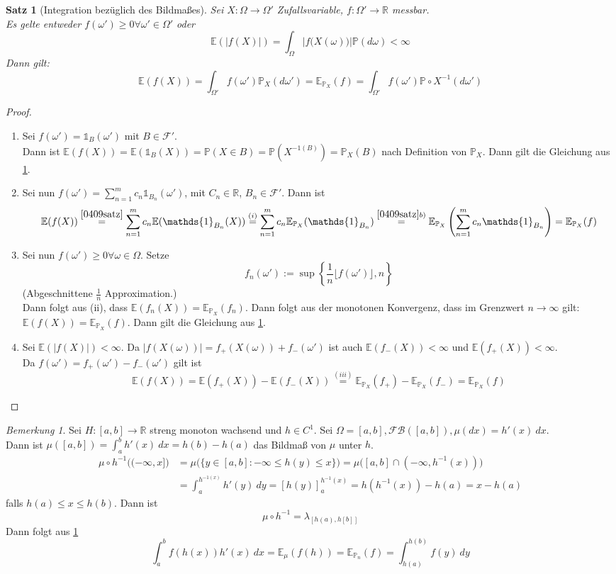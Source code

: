 \documentclass[10pt,a4paper]{article}
\newcommand{\R}{\ensuremath{\mathbb{R}}}
\newcommand{\la}{\ensuremath{\lambda}}
\newcommand{\cha}{\mathds{1}}
\newcommand{\Bor}{\mathscr B}
\newcommand{\Prb}{\mathbb P}
\newcommand{\Epv}{\ensuremath{\mathbb{E}}}
\newcommand{\scF}{\ensuremath{\mathscr{F}}}
\theoremstyle{plain}
\newtheorem{satz}[theorem]{Satz}
\theoremstyle{definition}
\theoremstyle{remark}
\newtheorem{bem}[theorem]{Bemerkung}
\begin{document}
	\begin{satz}[Integration bezüglich des Bildmaßes]\label{0417satz}
		Sei $X:\Omega\to\Omega'$ Zufallsvariable, $f:\Omega'\to\R$ messbar.\\
		Es gelte entweder $f(\omega')\geq 0\forall\omega'\in\Omega'$ oder
		\[\Epv\left(|f(X)|\right)=\int_\Omega|f\big(X(\omega)\big)|\Prb(d\omega)<\infty\]
		Dann gilt:
		\[\Epv(f(X))=\int_{\Omega'}f(\omega')\Prb_X(d\omega')=\Epv_{\Prb_X}(f)=\int_{\Omega'}f(\omega')\Prb\circ X^{-1}(d\omega')\]
	\end{satz}
	\begin{proof}
		\begin{enumerate}[label=(\roman*)]
			\item Sei $f(\omega')=\cha_B(\omega')$ mit $B\in\scF'$.\\
			Dann ist $\Epv(f(X))=\Epv(\cha_B(X))=\Prb(X\in B)=\Prb(X^{-1(B)})=\Prb_X(B)$ nach Definition von $\Prb_X$. Dann gilt die Gleichung aus \ref{0417satz}.
			\item Sei nun $f(\omega')=\sum_{n=1}^{m}c_n\cha_{B_n}(\omega')$, mit $C_n\in\R$, $B_n\in\scF'$.
			Dann ist
			\[\Epv(f(X))\overset{\ref{0409satz}}{=}\sum_{n=1}^{m}c_n\Epv(\cha_{B_n}(X))\overset{(i)}{=}\sum_{n=1}^{m}c_n\Epv_{\Prb_X}(\cha_{B_n})\overset{\ref{0409satz}b)}{=}\Epv_{\Prb_X}\left(\sum_{n=1}^{m}c_n\cha_{B_n}\right)=\Epv_{\Prb_X}(f)\]
			\item Sei nun $f(\omega')\geq 0\forall\omega\in\Omega$. Setze 
			\[f_n(\omega'):=\sup\left\{\frac{1}{n}\lfloor f(\omega')\rfloor,n\right\}\]
			(Abgeschnittene $\frac{1}{n}$ Approximation.)\\
			Dann folgt aus (ii), dass $\Epv(f_n(X))=\Epv_{\Prb_X}(f_n)$. Dann folgt aus der monotonen Konvergenz, dass im Grenzwert $n\to\infty$ gilt: $\Epv(f(X))=\Epv_{\Prb_X}(f)$. Dann gilt die Gleichung aus \ref{0417satz}.
			\item Sei $\Epv(|f(X)|)<\infty$. Da $|f(X(\omega))|=f_+(X(\omega))+f_-(\omega')$ ist auch $\Epv(f_-(X))<\infty$ und $\Epv(f_+(X))<\infty$.\\
			Da $f(\omega')=f_+(\omega')-f_-(\omega')$ gilt ist 
			\[\Epv(f(X))=\Epv(f_+(X))-\Epv(f_-(X))\overset{(iii)}{=}\Epv_{\Prb_X}(f_+)-\Epv_{\Prb_X}(f_-)=\Epv_{\Prb_X}(f)\]
		\end{enumerate}
	\end{proof}

	\begin{bem}
	 	Sei $H:[a,b]\to\R$ streng monoton wachsend und $h\in C^1$. Sei $\Omega=[a,b],\scF\Bor([a,b]),\mu(dx)=h'(x)~dx$.\\
		Dann ist $\mu([a,b])=\int_{a}^{b}h'(x)~dx=h(b)-h(a)$ das Bildmaß von $\mu$ unter $h$.
		\begin{align*}
		\mu\circ h^{-1}\big((-\infty,x]\big)&=\mu\big(\{y\in[a,b]:-\infty\leq h(y)\leq x\}\big)=\mu\big([a,b]\cap(-\infty,h^{-1}(x))\big)\\
		&=\int_{a}^{h^{-1(x)}}h'(y)~dy=\left[h(y)\right]_a^{h^{-1}(x)}=h(h^{-1}(x))-h(a)=x-h(a)
		\end{align*}
		falls $h(a)\leq x\leq h(b)$. Dann ist
		\[\mu\circ h^{-1}=\la_{[h(a),h[b]]}\]
		Dann folgt aus \ref{0417satz}
		\[\int_{a}^{b}f(h(x))h'(x)~dx=\Epv_\mu(f(h))=\Epv_{\Prb_n}(f)=\int_{h(a)}^{h(b)}f(y)~dy\]
	\end{bem}
\end{document}
